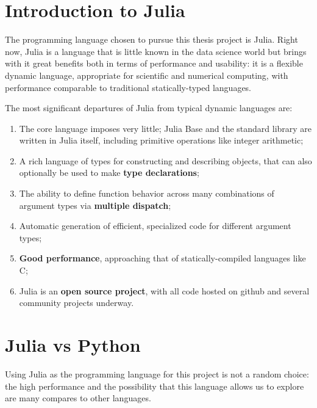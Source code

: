 \section{Introduction to Julia}
\label{sec:Introduction_to_Julia}
The programming language chosen to pursue this thesis project is Julia. Right now, Julia is a language that is little known in the data science world but brings with it great benefits both in terms of performance and usability: it is a flexible dynamic language, appropriate for scientific and numerical computing, with performance comparable to traditional statically-typed languages.  

The most significant departures of Julia from typical dynamic languages are:
\begin{enumerate}
    \item The core language imposes very little; Julia Base and the standard library are written in Julia itself, including primitive operations like integer arithmetic;
    \item A rich language of types for constructing and describing objects, that can also optionally be used to make \textbf{type declarations};
    \item The ability to define function behavior across many combinations of argument types via \textbf{multiple dispatch};
    \item Automatic generation of efficient, specialized code for different argument types;
    \item \textbf{Good performance}, approaching that of statically-compiled languages like C;
    \item Julia is an \textbf{open source project}, with all code hosted on github and several community projects underway.
\end{enumerate}


\section{Julia vs Python}
Using Julia as the programming language for this project is not a random choice: the high performance and the possibility that this language allows us to explore are many compares to other languages. 

